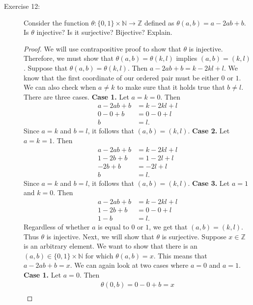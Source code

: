 \documentclass[12pt]{article}
\begin{document}
\begin{description}
\item[Exercise 12:] Consider the function $\theta:\{0,1\} \times \mathbb{N} \to \mathbb{Z}$ defined as $\theta(a,b)=a-2ab+b$. Is $\theta$ injective? Is it surjective? Bijective? Explain.
\begin{spacing}{2}
\begin{proof}
We will use contrapositive proof to show that $\theta$ is injective. Therefore, we must show that $\theta(a,b) = \theta(k,l)$ implies  $(a,b) = (k,l)$. Suppose that $\theta(a,b) = \theta(k,l)$. Then $a-2ab+b = k-2kl+l$. We know that the first coordinate of our ordered pair must be either $0$ or $1$. We can also check when $a \neq k$ to make sure that it holds true that $b \neq l$. There are three cases.
\newline
\textbf{Case 1.} Let $a = k = 0$. Then
\begin{align*}
    a-2ab+b &= k-2kl+l \\
    0-0+b &= 0-0+l \\
    b &= l.
\end{align*}
Since $a=k$ and $b=l$, it follows that $(a,b) = (k,l)$.
\newline
\textbf{Case 2.} Let $a = k = 1$. Then
\begin{align*}
    a-2ab+b &= k-2kl+l \\
    1-2b+b &= 1-2l+l \\
    -2b+b &= -2l+l \\
    b &= l.
\end{align*}
Since $a=k$ and $b=l$, it follows that $(a,b) = (k,l)$.
\newline
\textbf{Case 3.} Let $a = 1$ and $k = 0$. Then
\begin{align*}
    a-2ab+b &= k-2kl+l \\
    1-2b+b &= 0-0+l \\
    1-b &= l.
\end{align*}
Regardless of whether $a$ is equal to $0$ or $1$, we get that $(a,b) = (k,l)$. Thus $\theta$ is injective.
\newline
Next, we will show that $\theta$ is surjective. Suppose $x \in \mathbb{Z} $ is an arbitrary element. We want to show that there is an $(a,b) \in \{0,1\} \times \mathbb{N}$ for which $\theta(a,b) = x$. This means that $a -2ab + b = x$. We can again look at two cases where $a = 0$ and $a=1$.
\newline
\textbf{Case 1.} Let $a = 0$. Then
\begin{align*}
    \theta(0,b) = 0 - 0 + b = x \\

\end{align*}
\end{proof}
\end{spacing}
\end{description}
\end{document}
